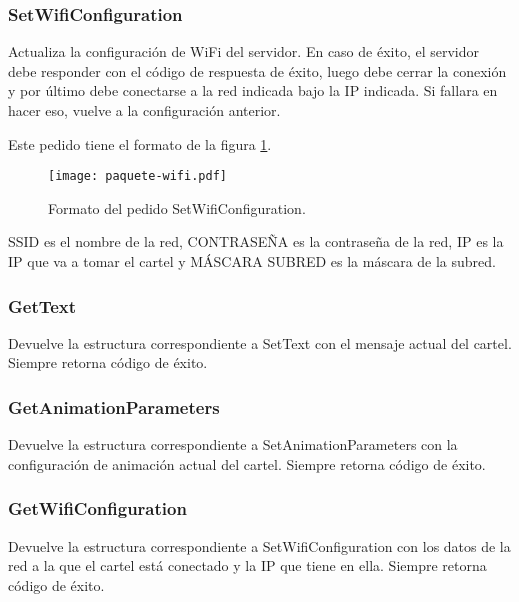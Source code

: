 \subsubsection{SetWifiConfiguration}
Actualiza la configuración de WiFi del servidor. En caso de éxito, el servidor debe responder con el código de respuesta de éxito, luego debe cerrar la conexión y por último debe conectarse a la red indicada bajo la IP indicada. Si fallara en hacer eso, vuelve a la configuración anterior.

Este pedido tiene el formato de la figura \ref{fig:paquete-wifi}.
\begin{figure}[h]
	\centering
	\texttt{[image: paquete-wifi.pdf]}
	\caption{Formato del pedido SetWifiConfiguration.}
	\label{fig:paquete-wifi}
\end{figure}

SSID es el nombre de la red, CONTRASEÑA es la contraseña de la red, IP es la IP que va a tomar el cartel y MÁSCARA SUBRED es la máscara de la subred.

\subsubsection{GetText}
Devuelve la estructura correspondiente a SetText con el mensaje actual del cartel.
Siempre retorna código de éxito.

\subsubsection{GetAnimationParameters}
Devuelve la estructura correspondiente a SetAnimationParameters con la configuración de animación actual del cartel.
Siempre retorna código de éxito.

\subsubsection{GetWifiConfiguration}
Devuelve la estructura correspondiente a SetWifiConfiguration con los datos de la red a la que el cartel está conectado y la IP que tiene en ella.
Siempre retorna código de éxito.
